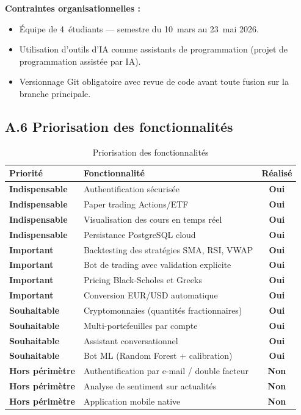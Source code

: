 \documentclass[a4paper, 12pt, twoside]{article}
\begin{document}
    \textbf{Contraintes organisationnelles :}
    \begin{itemize}
        \item Équipe de 4~étudiants --- semestre du 10~mars au 23~mai 2026.
        \item Utilisation d'outils d'IA comme assistants de programmation
              (projet de programmation assistée par IA).
        \item Versionnage Git obligatoire avec revue de code avant toute
              fusion sur la branche principale.
    \end{itemize}

    \subsection*{A.6 Priorisation des fonctionnalités}

    \begin{table}[h]
    \centering
    \begin{tabular}{|>{\bfseries}l|p{8cm}|>{\bfseries}c|}
    \hline
    Priorité & Fonctionnalité & Réalisé \\
    \hline
    Indispensable & Authentification sécurisée & Oui \\
    Indispensable & Paper trading Actions/ETF & Oui \\
    Indispensable & Visualisation des cours en temps réel & Oui \\
    Indispensable & Persistance PostgreSQL cloud & Oui \\
    \hline
    Important & Backtesting des stratégies SMA, RSI, VWAP & Oui \\
    Important & Bot de trading avec validation explicite & Oui \\
    Important & Pricing Black-Scholes et Greeks & Oui \\
    Important & Conversion EUR/USD automatique & Oui \\
    \hline
    Souhaitable & Cryptomonnaies (quantités fractionnaires) & Oui \\
    Souhaitable & Multi-portefeuilles par compte & Oui \\
    Souhaitable & Assistant conversationnel & Oui \\
    Souhaitable & Bot ML (Random Forest + calibration) & Oui \\
    \hline
    Hors périmètre & Authentification par e-mail / double facteur & Non \\
    Hors périmètre & Analyse de sentiment sur actualités & Non \\
    Hors périmètre & Application mobile native & Non \\
    \hline
    \end{tabular}
    \caption{Priorisation des fonctionnalités}
    \end{table}
\end{document}
